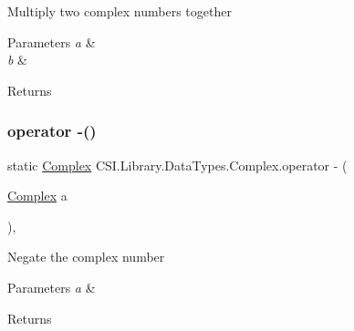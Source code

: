 Multiply two complex numbers together 


\begin{DoxyParams}{Parameters}
{\em a} & \\
\hline
{\em b} & \\
\hline
\end{DoxyParams}
\begin{DoxyReturn}{Returns}

\end{DoxyReturn}
\mbox{\label{struct_c_s_i_1_1_library_1_1_data_types_1_1_complex_a30b7b337791642a2ac300121ba0bad0f}} 
\subsubsection{\texorpdfstring{operator -\/()}{operator -()}\hspace{0.1cm}{\footnotesize\ttfamily [1/4]}}
{\footnotesize\ttfamily static \mbox{\hyperlink{struct_c_s_i_1_1_library_1_1_data_types_1_1_complex}{Complex}} C\+S\+I.\+Library.\+Data\+Types.\+Complex.\+operator -\/ (\begin{DoxyParamCaption}\item[{\mbox{\hyperlink{struct_c_s_i_1_1_library_1_1_data_types_1_1_complex}{Complex}}}]{a }\end{DoxyParamCaption})\hspace{0.3cm}{\ttfamily [inline]}, {\ttfamily [static]}}



Negate the complex number 


\begin{DoxyParams}{Parameters}
{\em a} & \\
\hline
\end{DoxyParams}
\begin{DoxyReturn}{Returns}

\end{DoxyReturn}
\mbox{\label{struct_c_s_i_1_1_library_1_1_data_types_1_1_complex_a3ac8d7261717050f5169609f0eb920a2}} 
